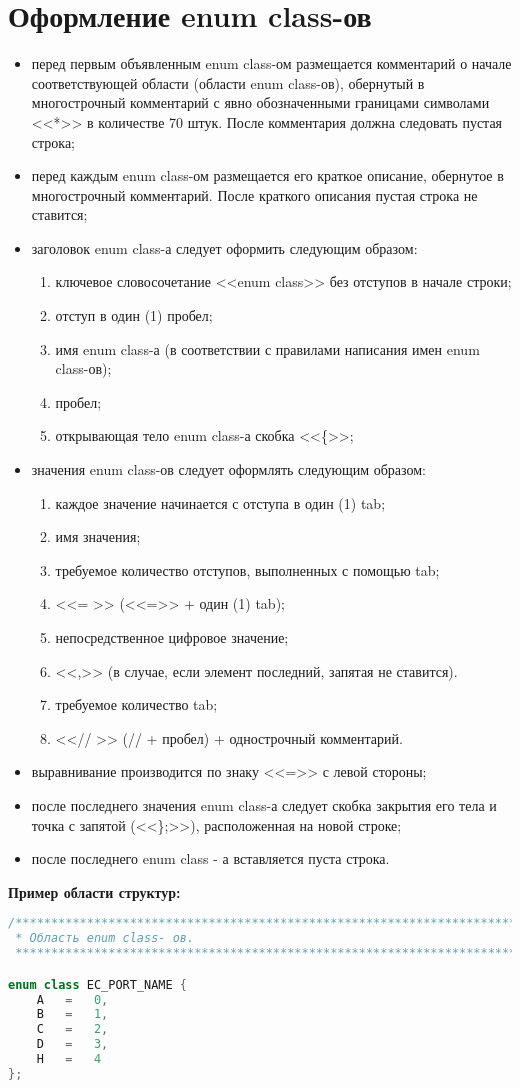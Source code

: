 \section{Оформление enum class-ов}
\begin{itemize}
	\item перед первым объявленным enum class-ом размещается комментарий о начале соответствующей области (области enum class-ов), обернутый в многострочный комментарий с явно обозначенными границами символами <<*>> в количестве 70 штук. После комментария должна следовать  пустая строка;
	\item перед каждым enum class-ом размещается его краткое описание, обернутое в многострочный комментарий. После краткого описания пустая строка не ставится;
	\item заголовок enum class-а следует оформить следующим образом:
	\begin{enumerate}
		\item ключевое словосочетание <<enum class>> без отступов в начале строки;
		\item отступ в один (1) пробел;
		\item имя enum class-а (в соответствии с правилами написания имен enum class-ов);
		\item пробел;
		\item открывающая тело enum class-а скобка <<\{>>;
	\end{enumerate}
	\item значения enum class-ов следует оформлять следующим образом:
	\begin{enumerate}
		\item каждое значение начинается с отступа в один (1) tab;
		\item имя значения;
		\item требуемое количество отступов, выполненных с помощью tab;
		\item <<=	>> (<<=>> + один (1) tab);
		\item непосредственное цифровое значение;
		\item <<,>> (в случае, если элемент последний, запятая не ставится).
		\item требуемое количество tab;
		\item <<// >> (// + пробел) + однострочный комментарий.
	\end{enumerate}
	\item выравнивание производится по знаку <<=>> с левой стороны;
	\item после последнего значения enum class-а следует скобка закрытия его тела и точка с запятой (<<\};>>), расположенная на новой строке;
	\item после последнего enum class - а вставляется пуста строка.
\end{itemize}\textbf{Пример области структур:}\begin{lstlisting}[language=C++, frame=tlBR, basicstyle=\fontsize{10}{10}\ttfamily]
/**********************************************************************
 * Область enum class- ов.
 **********************************************************************/

enum class EC_PORT_NAME {
	A	=	0,
	B	=	1,
	C	=	2,
	D	=	3,
	H	=	4
};\end{lstlisting}